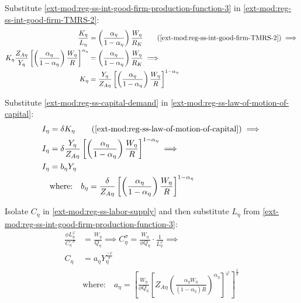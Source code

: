 \documentclass[../thesis.tex]{subfiles}
\begin{document}

Substitute \ref{ext-mod:reg-ss-int-good-firm-production-function-3} in \ref{ext-mod:reg-ss-int-good-firm-TMRS-2}:
\begin{align}
	\frac{K_{\eta}}{L_{\eta}} &= \left( \frac{{\alpha_{\eta}}}{1-\alpha_{\eta}} \right) \frac{W_{\eta}}{R_{K}} \tag{\ref{ext-mod:reg-ss-int-good-firm-TMRS-2}} \implies \\
	K_{\eta} \frac{Z_{A\eta}}{Y_{\eta}} \left[ \left( \frac{\alpha_{\eta}}{1-\alpha_{\eta}} \right) \frac{W_{\eta}}{R} \right]^{\alpha_{\eta}} &= \left( \frac{{\alpha_{\eta}}}{1-\alpha_{\eta}} \right) \frac{W_{\eta}}{R_{K}} \implies \nonumber \\
	K_{\eta} &= \frac{Y_{\eta}}{Z_{A\eta}} \left[ \left( \frac{{\alpha_{\eta}}}{1-\alpha_{\eta}} \right) \frac{W_{\eta}}{R} \right]^{1 - \alpha_{\eta}} \label{ext-mod:reg-ss-capital-demand}
\end{align}


Substitute \ref{ext-mod:reg-ss-capital-demand} in \ref{ext-mod:reg-ss-law-of-motion-of-capital}:
\begin{align}
	I_{\eta} &= \delta K_{\eta} \tag{\ref{ext-mod:reg-ss-law-of-motion-of-capital}} \implies \\
	I_{\eta} &= \delta \frac{Y_{\eta}}{Z_{A\eta}} \left[ \left( \frac{{\alpha_{\eta}}}{1-\alpha_{\eta}} \right) \frac{W_{\eta}}{R} \right]^{1 - \alpha_{\eta}} \implies \\
	I_{\eta} &= b_{\eta} Y_{\eta} \label{ext-mod:reg-ss-law-of-motion-of-capital-2} \\
	& \text{where:} \quad b_{\eta} = \frac{\delta}{Z_{A\eta}} \left[ \left( \frac{{\alpha_{\eta}}}{1-\alpha_{\eta}} \right) \frac{W_{\eta}}{R} \right]^{1 - \alpha_{\eta}} \label{ext-mod:reg-ss-b-eta}
\end{align}

	
	Isolate $C_{\eta}$ in \ref{ext-mod:reg-ss-labor-supply} and then substitute $L_{\eta}$ from \ref{ext-mod:reg-ss-int-good-firm-production-function-3}:
	\begin{align}
		\frac{\phi L_{\eta}^{\varphi}}{C_{\eta}^{-\sigma}} &= \frac{W_{\eta}}{Q_{\eta}} \implies C_{\eta}^{\sigma} = \frac{W_{\eta}}{\phi Q_{\eta}} \cdot \frac{1}{L_{\eta}^{\varphi}} \implies \nonumber\\
		C_{\eta} &= a_{\eta} Y_{\eta}^{\frac{-\varphi}{\sigma}} \label{ext-mod:reg-ss-consumption} \\
		& \text{where:} \quad a_{\eta} = \left[ \frac{W_{\eta}}{\phi Q_{\eta}} \left[ Z_{A\eta} \left( \frac{\alpha_{\eta} W_{\eta}}{(1 - \alpha_{\eta}) R} \right)^{\alpha_{\eta}} \right]^{\varphi} \right]^{\frac{1}{\sigma}}  \label{ext-mod:reg-ss-a-eta}
	\end{align}
\end{document}
